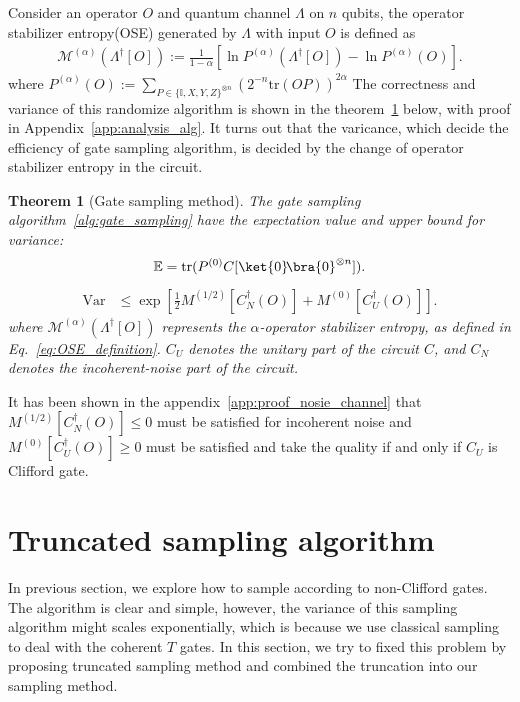 \documentclass[aps,%
twocolumn,%
floatfix,%
pra,%
amsfonts,%
longbibliography,%
groupedaddress,%
superscriptaddress]{revtex4-2}%
\newtheorem{theorem}{Theorem}
\newcommand{\1}{\mathbbm{1}}
\begin{document}
Consider an operator $O$ and quantum channel $\Lambda$ on $n$ qubits, the operator stabilizer entropy(OSE) generated by $\Lambda$ with input $O$ is defined as
\begin{align}
\label{eq:OSE_definition}
    \mathcal{M}^{(\alpha)}({\Lambda}^\dagger[O]) := \frac{1}{1 - \alpha} \left[\ln P^{(\alpha)}(\Lambda^{\dagger}[O]) - \ln P^{(\alpha)}(O)\right].
\end{align}
where $P^{(\alpha)}(O):=\sum_{P \in \{\mathbb{I},X,Y,Z\}^{\otimes n}}\left({2^{-n}}\text{tr}(OP)\right)^{2 \alpha}$
The correctness and variance of this randomize algorithm is shown in the theorem~\ref{theo:gate-sampling-method} below, with proof in Appendix~\ref{app:analysis_alg}. It turns out that the varicance, which decide the efficiency of gate sampling algorithm, is decided by the change of operator stabilizer entropy in the circuit. 
\begin{theorem}[Gate sampling method] \label{theo:gate-sampling-method}
The gate sampling algorithm~\ref{alg:gate_sampling}  have the expectation value and upper bound for variance:
\begin{align}
    \mathbb{E}  = \text{tr}( P^{(0)} C[\ket{0}\!\bra{0}^{\otimes n}] ).
\end{align}
\color{red}
\begin{align}
    \text{Var}&\leq \exp\left[ \frac{1}{2} M^{(1/2)}[C_N^\dagger(O)]  + M^{(0)}[C_U^\dagger(O)] \right].
\end{align}
\color{black}
where $\mathcal{M}^{(\alpha)}({\Lambda}^\dagger[O])$ represents the $\alpha$-operator stabilizer entropy, as defined in Eq.~\eqref{eq:OSE_definition}. $C_U$ denotes the unitary part of the circuit $C$, and $C_N$ denotes the incoherent-noise part of the circuit.
\end{theorem}
It has been shown in the appendix~\ref{app:proof_nosie_channel} that $M^{(1/2)}[C_N^\dagger(O)]  \leq 0$ must be satisfied for incoherent noise and $ M^{(0)}[C_U^\dagger(O)] \geq0$ must be satisfied and take the quality if and only if $C_U$ is Clifford gate. 


\section{Truncated sampling algorithm}
In previous section, we explore how to sample according to non-Clifford gates. The algorithm is clear and simple, however, the variance of this sampling algorithm might scales exponentially, which is because we use classical sampling to deal with the coherent  $T$ gates. In this section, we try to fixed this problem by proposing truncated sampling method and combined the truncation into our sampling method.
\end{document}
